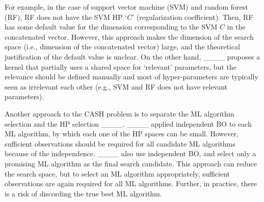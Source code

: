 For example, in the case of support vector machine (SVM) and random forest (RF), RF does not have the SVM HP `$C$' (regularization coefficient). 
%
Then, RF has some default value for the dimension corresponding to the SVM $C$ in the concatenated vector.
%
However, this approach makes the dimension of the search space (i.e., dimension of the concatenated vector) large, and the theoretical justification of the default value is unclear.
%
On the other hand, ____ proposes a kernel that partially uses a shared space for `relevant' parameters, but the relevance should be defined manually and most of hyper-parameters are typically seen as irrelevant each other (e.g., SVM and RF does not have relevant parameters). 



Another approach to the CASH problem is to separate the ML algorithm selection and the HP selection ____.
%
____ applied independent BO to each ML algorithm, by which each one of the HP spaces can be small.
%
However, sufficient observations should be required for all candidate ML algorithms because of the independence. 
____ also use independent BO, and select only a promising ML algorithm as the final search candidate. 
%
This approach can reduce the search space, but to select an ML algorithm appropriately, sufficient observations are again required for all ML algorithms.
%
Further, in practice, there is a risk of discording the true best ML algorithm.


